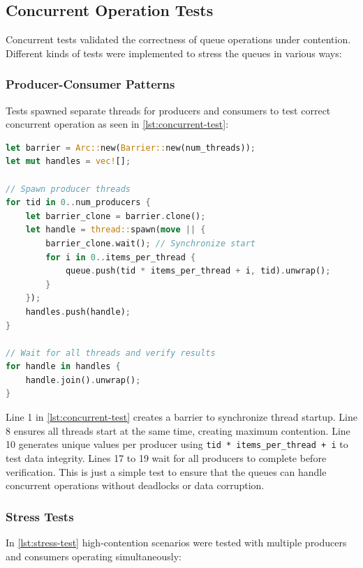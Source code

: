\subsection{Concurrent Operation Tests}
Concurrent tests validated the correctness of queue operations under contention. Different kinds of tests were implemented to stress the queues in various ways:

\subsubsection{Producer-Consumer Patterns}
Tests spawned separate threads for producers and consumers to test correct concurrent operation as seen in \cref{lst:concurrent-test}:

\begin{lstlisting}[language=Rust, style=boxed, caption={Concurrent test pattern}, label={lst:concurrent-test}]
let barrier = Arc::new(Barrier::new(num_threads));
let mut handles = vec![];

// Spawn producer threads
for tid in 0..num_producers {
    let barrier_clone = barrier.clone();
    let handle = thread::spawn(move || {
        barrier_clone.wait(); // Synchronize start
        for i in 0..items_per_thread {
            queue.push(tid * items_per_thread + i, tid).unwrap();
        }
    });
    handles.push(handle);
}

// Wait for all threads and verify results
for handle in handles {
    handle.join().unwrap();
}
\end{lstlisting}

Line 1 in \cref{lst:concurrent-test} creates a barrier to synchronize thread startup. Line 8 ensures all threads start at the same time, creating maximum contention. Line 10 generates unique values per producer using \texttt{tid * items\_per\_thread + i} to test data integrity. Lines 17 to 19 wait for all producers to complete before verification. This is just a simple test to ensure that the queues can handle concurrent operations without deadlocks or data corruption.

\subsubsection{Stress Tests}
In \cref{lst:stress-test} high-contention scenarios were tested with multiple producers and consumers operating simultaneously:

